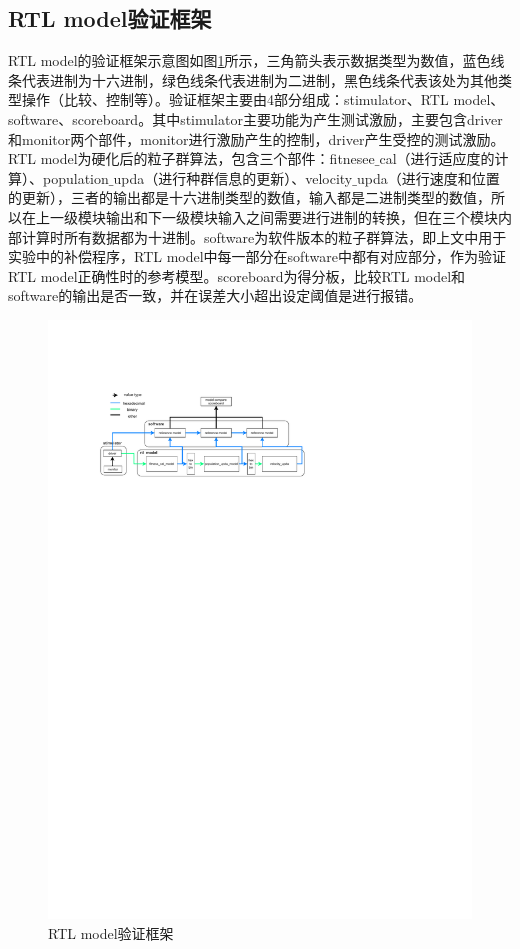 \subsection{RTL model验证框架}
\label{RTL model验证框架}
RTL model的验证框架示意图如图\ref{fig:RTL model验证框架}所示，三角箭头表示数据类型为数值，蓝色线条代表进制为十六进制，绿色线条代表进制为二进制，黑色线条代表该处为其他类型操作（比较、控制等）。验证框架主要由4部分组成：stimulator、RTL model、software、scoreboard。其中stimulator主要功能为产生测试激励，主要包含driver和monitor两个部件，monitor进行激励产生的控制，driver产生受控的测试激励。RTL model为硬化后的粒子群算法，包含三个部件：fitnesee$\_$cal（进行适应度的计算）、population$\_$upda（进行种群信息的更新）、velocity$\_$upda（进行速度和位置的更新），三者的输出都是十六进制类型的数值，输入都是二进制类型的数值，所以在上一级模块输出和下一级模块输入之间需要进行进制的转换，但在三个模块内部计算时所有数据都为十进制。software为软件版本的粒子群算法，即上文中用于实验中的补偿程序，RTL model中每一部分在software中都有对应部分，作为验证RTL model正确性时的参考模型。scoreboard为得分板，比较RTL model和software的输出是否一致，并在误差大小超出设定阈值是进行报错。
\begin{figure}[htb]
  \centering
  \includegraphics[width=14cm]{fig/4-fig/rtl_model验证环境.drawio.pdf}
  \caption{RTL model验证框架}
  \label{fig:RTL model验证框架}
\end{figure}

